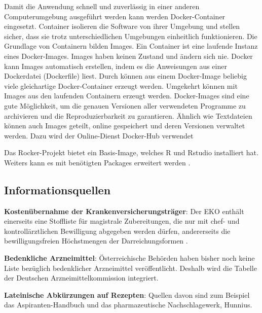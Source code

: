 \documentclass[12pt,a4paper]{article}
\begin{document}
Damit die Anwendung schnell und zuverlässig in einer anderen Computerumgebung ausgeführt werden kann werden Docker-Container eingesetzt. Container isolieren die Software von ihrer Umgebung und stellen sicher, dass sie trotz unterschiedlichen Umgebungen einheitlich funktionieren. 
Die Grundlage von Containern bilden Images.
Ein Container ist eine laufende Instanz eines Docker-Images. Images haben keinen Zustand und ändern sich nie. Docker kann Images automatisch erstellen, indem es die Anweisungen aus einer Dockerdatei (Dockerfile) liest. Durch  können aus einem Docker-Image beliebig viele gleichartige Docker-Container erzeugt werden. Umgekehrt können mit  Images aus den laufenden Containern erzeugt werden. Docker-Images sind eine gute Möglichkeit, um die genauen Versionen aller verwendeten Programme zu archivieren und die Reproduzierbarkeit zu garantieren. Ähnlich wie Textdateien können auch Images geteilt, online gespeichert und deren Versionen verwaltet werden. Dazu wird der Online-Dienst Docker-Hub verwendet \cite{Docker.18.03.2022,IONOSDigitalguide.22.03.2022,DockerDocumentation.22.03.2022}


Das Rocker-Projekt bietet ein Basis-Image, welches R und Rstudio installiert hat. Weiters kann es mit benötigten Packages erweitert werden \cite{.22.03.2022d}.


\subsection{Informationsquellen}

\textbf{Kostenübernahme der Krankenversicherungsträger}: Der \ac{EKO} enthält einerseits eine Stoffliste für magistrale Zubereitungen, die nur mit chef- und kontrollärztlichen Bewilligung abgegeben werden dürfen, andererseits die bewilligungsfreien Höchstmengen der Darreichungsformen \cite{.2014}.
 

\textbf{Bedenkliche Arzneimittel}: Österreichische Behörden haben bisher noch keine Liste bezüglich bedenklicher Arzneimittel veröffentlicht. Deshalb wird die Tabelle der Deutschen Arzneimittelkommission integriert. 

\textbf{Lateinische Abkürzungen auf Rezepten}: Quellen davon sind zum Beispiel das Aspiranten-Handbuch und das pharmazeutische Nachschlagewerk, Hunnius.
\end{document}
